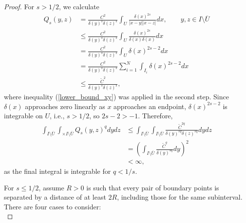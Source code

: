 \documentclass[preprint,12pt]{elsarticle}
\begin{document}
\begin{proof}
    For $s>1/2$, we calculate
    \begin{align}\label{Q_bound_s>1/2}
        Q_s(y,z)&=\frac{C^2}{\delta(y)^s\delta(z)^s}\int_{U}\frac{\delta(x)^{2s}}{|x-y||x-z|}dx, \qquad y,z\in I\setminus\overline{U}\nonumber\\
        &\leq\frac{C^2}{\delta(y)^s\delta(z)^s}\int_{U}\frac{\delta(x)^{2s}}{\delta(x)\delta(x)}dx\nonumber\\
        &=\frac{C^2}{\delta(y)^s\delta(z)^s}\int_{U}\delta(x)^{2s-2}dx\nonumber\\
        &=\frac{C^2}{\delta(y)^s\delta(z)^s}\sum_{i=1}^N\int_{I_i}\delta(x)^{2s-2}dx\nonumber\\
        &\leq \frac{\tilde{C}^2}{\delta(y)^s\delta(z)^s},
    \end{align}
    where inequality (\ref{lower_bound_xy}) was applied in the second step. Since $\delta(x)$ approaches zero linearly as $x$ approaches an endpoint, $\delta(x)^{2s-2}$ is integrable on $U$, i.e., $s>1/2$, so $2s-2>-1$. Therefore,
    \begin{align}\label{s>1/2_Qq_bound}
        \int_{I\setminus\overline{U}}\int_{\times I\setminus\overline{U}} Q_s(y,z)^qdydz&\leq\int_{I\setminus\overline{U}}\int_{I\setminus\overline{U}}\frac{\tilde{C}^{2q}}{\delta(y)^{sq}\delta(z)^{sq}}dydz\nonumber\\
        &=\left(\int_{I\setminus\overline{U}}\frac{\tilde{C}^q}{\delta(y)^{sq}}dy\right)^2\nonumber\\
        &< \infty,
    \end{align}
    as the final integral is integrable for $q<1/s$.

    For $s\leq 1/2$, assume $R>0$ is such that every pair of boundary points is separated by a distance of at least $2R$, including those for the same subinterval. %
    There are four cases to consider:\\


\end{proof}
\end{document}
